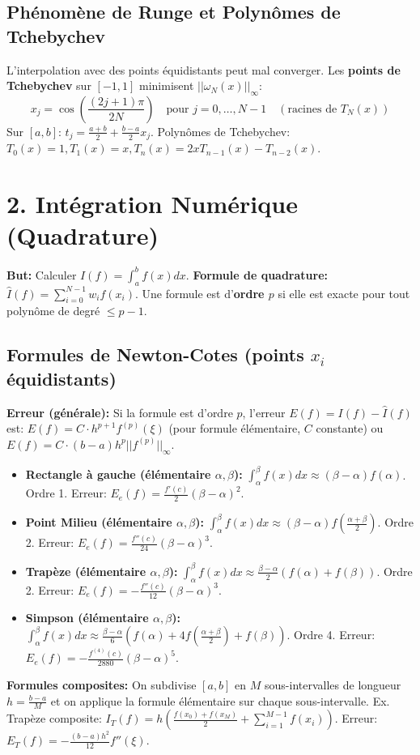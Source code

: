 \documentclass[10pt,a4paper]{article}
\begin{document}
\subsection*{Phénomène de Runge et Polynômes de Tchebychev}
L'interpolation avec des points équidistants peut mal converger.
Les \textbf{points de Tchebychev} sur $[-1,1]$ minimisent $||\omega_N(x)||_\infty$:
\begin{equation*}
    x_j = \cos\left(\frac{(2j+1)\pi}{2N}\right) \quad \text{pour } j=0,\dots,N-1 \quad (\text{racines de } T_N(x))
\end{equation*}
Sur $[a,b]$: $t_j = \frac{a+b}{2} + \frac{b-a}{2} x_j$.
Polynômes de Tchebychev: $T_0(x)=1, T_1(x)=x, T_n(x) = 2xT_{n-1}(x) - T_{n-2}(x)$.

\section*{2. Intégration Numérique (Quadrature)}
\textbf{But:} Calculer $I(f) = \int_a^b f(x)dx$.
\textbf{Formule de quadrature:} $\hat{I}(f) = \sum_{i=0}^{N-1} w_i f(x_i)$.
Une formule est d'\textbf{ordre $p$} si elle est exacte pour tout polynôme de degré $\le p-1$.

\subsection*{Formules de Newton-Cotes (points $x_i$ équidistants)}
\textbf{Erreur (générale):} Si la formule est d'ordre $p$, l'erreur $E(f) = I(f) - \hat{I}(f)$ est:
$E(f) = C \cdot h^{p+1} f^{(p)}(\xi)$ (pour formule élémentaire, $C$ constante) ou $E(f) = C \cdot (b-a)h^p ||f^{(p)}||_\infty$.

\begin{itemize}
    \item \textbf{Rectangle à gauche (élémentaire $\alpha, \beta$):} $\int_\alpha^\beta f(x)dx \approx (\beta-\alpha)f(\alpha)$. Ordre 1.
    Erreur: $E_e(f) = \frac{f'(c)}{2}(\beta-\alpha)^2$.
    \item \textbf{Point Milieu (élémentaire $\alpha, \beta$):} $\int_\alpha^\beta f(x)dx \approx (\beta-\alpha)f\left(\frac{\alpha+\beta}{2}\right)$. Ordre 2.
    Erreur: $E_e(f) = \frac{f''(c)}{24}(\beta-\alpha)^3$.
    \item \textbf{Trapèze (élémentaire $\alpha, \beta$):} $\int_\alpha^\beta f(x)dx \approx \frac{\beta-\alpha}{2}(f(\alpha)+f(\beta))$. Ordre 2.
    Erreur: $E_e(f) = -\frac{f''(c)}{12}(\beta-\alpha)^3$.
    \item \textbf{Simpson (élémentaire $\alpha, \beta$):} $\int_\alpha^\beta f(x)dx \approx \frac{\beta-\alpha}{6}\left(f(\alpha)+4f\left(\frac{\alpha+\beta}{2}\right)+f(\beta)\right)$. Ordre 4.
    Erreur: $E_e(f) = -\frac{f^{(4)}(c)}{2880}(\beta-\alpha)^5$.
\end{itemize}
\textbf{Formules composites:} On subdivise $[a,b]$ en $M$ sous-intervalles de longueur $h=\frac{b-a}{M}$ et on applique la formule élémentaire sur chaque sous-intervalle.
Ex. Trapèze composite: $I_T(f) = h \left( \frac{f(x_0)+f(x_M)}{2} + \sum_{i=1}^{M-1} f(x_i) \right)$. Erreur: $E_T(f) = -\frac{(b-a)h^2}{12}f''(\xi)$.
\end{document}
